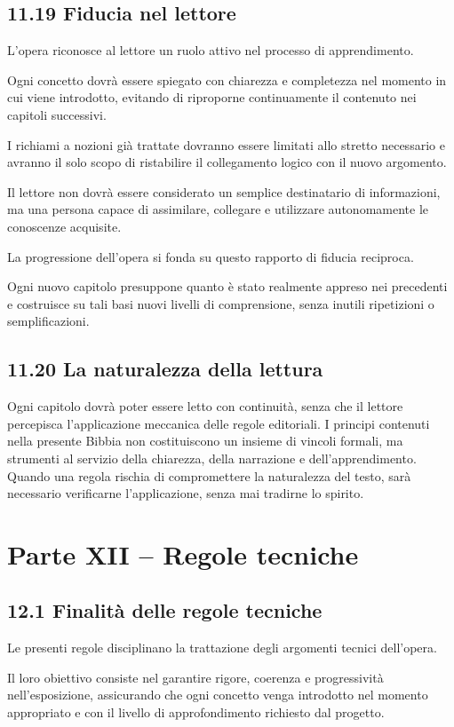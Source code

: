 \documentclass{article}
\begin{document}
\subsection{11.19 Fiducia nel lettore}
L'opera riconosce al lettore un ruolo attivo nel processo di apprendimento.

Ogni concetto dovrà essere spiegato con chiarezza e completezza nel momento in cui viene introdotto, evitando di
riproporne continuamente il contenuto nei capitoli successivi.

I richiami a nozioni già trattate dovranno essere limitati allo stretto necessario e avranno il solo scopo di
ristabilire il collegamento logico con il nuovo argomento.

Il lettore non dovrà essere considerato un semplice destinatario di informazioni, ma una persona capace di assimilare,
collegare e utilizzare autonomamente le conoscenze acquisite.

La progressione dell'opera si fonda su questo rapporto di fiducia reciproca.

Ogni nuovo capitolo presuppone quanto è stato realmente appreso nei precedenti e costruisce su tali basi nuovi livelli
di comprensione, senza inutili ripetizioni o semplificazioni.

\subsection{11.20 La naturalezza della lettura}
Ogni capitolo dovrà poter essere letto con continuità, senza che il lettore percepisca l'applicazione meccanica delle
regole editoriali. I principi contenuti nella presente Bibbia non costituiscono un insieme di vincoli formali, ma
strumenti al servizio della chiarezza, della narrazione e dell'apprendimento. Quando una regola rischia di
compromettere la naturalezza del testo, sarà necessario verificarne l'applicazione, senza mai tradirne lo spirito.

\section{Parte XII – Regole tecniche}
\subsection{12.1 Finalità delle regole tecniche}
Le presenti regole disciplinano la trattazione degli argomenti tecnici dell'opera.

Il loro obiettivo consiste nel garantire rigore, coerenza e progressività nell'esposizione, assicurando che ogni
concetto venga introdotto nel momento appropriato e con il livello di approfondimento richiesto dal progetto.
\end{document}
